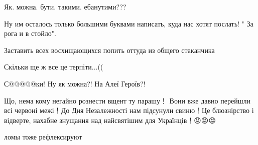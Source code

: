 \begin{itemize}
Як. можна. бути. такими. ебанутими???

 
Ну им осталось только большими буквами написать, куда нас хотят послать! " За рога и в стойло".

 
Заставить всех восхищающихся попить оттуда из общего стаканчика \Laughey[1.0][white]

 
Скільки ще ж все це терпіти...((

 
С@@@@@ки! Ну як можна?! На Алеї Героїв?!

 

Що, нема кому негайно рознести вщент ту парашу！ Вони вже давно перейшли всі
червоні межі！До Дня Незалежності нам підсунули свиню！Це блюзнірство і
відверте, нахабне знущання над найсвятішим для Українців！😡😡😡


 
ломы тоже рефлексируют


\end{itemize}
